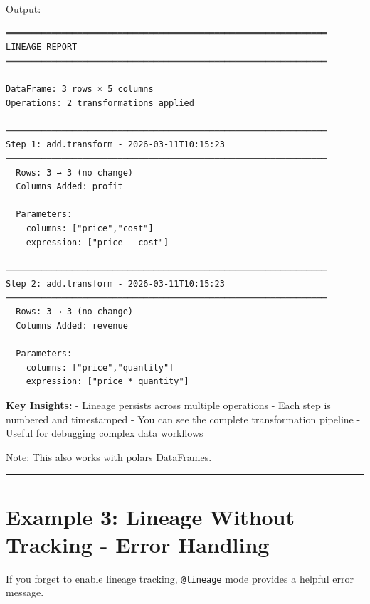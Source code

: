 \documentclass[
  letterpaper,
]{scrbook}
\begin{document}
Output:

\begin{verbatim}
═══════════════════════════════════════════════════════════════
LINEAGE REPORT
═══════════════════════════════════════════════════════════════

DataFrame: 3 rows × 5 columns
Operations: 2 transformations applied

───────────────────────────────────────────────────────────────
Step 1: add.transform - 2026-03-11T10:15:23
───────────────────────────────────────────────────────────────
  Rows: 3 → 3 (no change)
  Columns Added: profit
  
  Parameters:
    columns: ["price","cost"]
    expression: ["price - cost"]

───────────────────────────────────────────────────────────────
Step 2: add.transform - 2026-03-11T10:15:23
───────────────────────────────────────────────────────────────
  Rows: 3 → 3 (no change)
  Columns Added: revenue
  
  Parameters:
    columns: ["price","quantity"]
    expression: ["price * quantity"]
\end{verbatim}

\textbf{Key Insights:} - Lineage persists across multiple operations -
Each step is numbered and timestamped - You can see the complete
transformation pipeline - Useful for debugging complex data workflows

Note: This also works with polars DataFrames.

\begin{center}\rule{0.5\linewidth}{0.5pt}\end{center}

\section{Example 3: Lineage Without Tracking - Error
Handling}\label{example-3-lineage-without-tracking---error-handling}

If you forget to enable lineage tracking, \texttt{@lineage} mode
provides a helpful error message.
\end{document}
